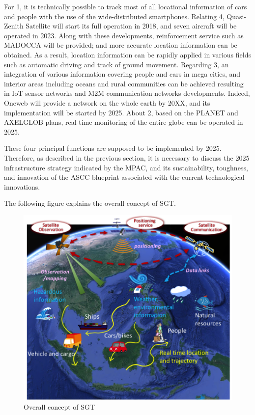 For 1, it is technically possible to track most of all locational information of cars and people with the use of the wide-distributed smartphones. Relating 4, Quasi-Zenith Satellite will start its full operation in 2018, and seven aircraft will be operated in 2023. Along with these developments, reinforcement service such as MADOCCA will be provided; and more accurate location information can be obtained. As a result, location information can be rapidly applied in various fields such as automatic driving and track of ground movement. Regarding 3, an integration of various information covering people and cars in mega cities, and interior areas including oceans and rural communities can be achieved resulting in IoT sensor networks and M2M communication networks developments. Indeed, Oneweb will provide a network on the whole earth by 20XX, and its implementation will be started by 2025. About 2, based on the PLANET and AXELGLOB plans, real-time monitoring of the entire globe can be operated in 2025.

\vspace{0.4 cm}

These four principal functions are supposed to be implemented by 2025. Therefore, as described in the previous section, it is necessary to discuss the 2025 infrastructure strategy indicated by the MPAC, and its sustainability, toughness, and innovation of the ASCC blueprint associated with the current technological innovations.

\vspace{0.4 cm}

The following figure explains the overall concept of SGT.

\vspace{0.4 cm}

\begin{figure}[H]
\begin{center}
\includegraphics[width = 0.8\linewidth]{Figures/sgt_overall.png}
\end{center}
\caption{Overall concept of SGT}
\label{sgt_overall}
\end{figure}

